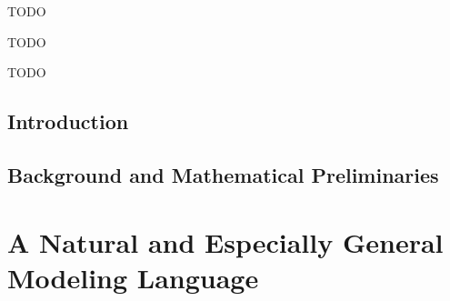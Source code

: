 \documentclass[tocprelim,
    ]{cornellmodified}
\begin{document}
\begin{biosketch}
TODO
\end{biosketch}

\begin{dedication}
TODO
\end{dedication}

\begin{acknowledgements}
TODO


\end{acknowledgements}

\contentspage
\figurelistpage

\normalspacing \setcounter{page}{1} 
\pagestyle{cornell} \addtolength{\parskip}{0.5\baselineskip}


\chapter{Introduction}
    
\chapter{Background and Mathematical Preliminaries}
    

\part{A Natural and Especially General Modeling Language} \label{part:univ-model}
\end{document}
